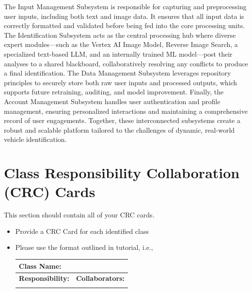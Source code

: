 \documentclass[]{article}
\begin{document}
\noindent The Input Management Subsystem is responsible for capturing and preprocessing user inputs, including both text and image data. It ensures that all input data is correctly formatted and validated before being fed into the core processing units. The Identification Subsystem acts as the central processing hub where diverse expert modules—such as the Vertex AI Image Model, Reverse Image Search, a specialized text-based LLM, and an internally trained ML model—post their analyses to a shared blackboard, collaboratively resolving any conflicts to produce a final identification. The Data Management Subsystem leverages repository principles to securely store both raw user inputs and processed outputs, which supports future retraining, auditing, and model improvement. Finally, the Account Management Subsystem handles user authentication and profile management, ensuring personalized interactions and maintaining a comprehensive record of user engagements. Together, these interconnected subsystems create a robust and scalable platform tailored to the challenges of dynamic, real-world vehicle identification.


	
\section{Class Responsibility Collaboration (CRC) Cards}
\label{sec:class_responsibility_collaboration_crc_cards}
This section should contain all of your CRC cards.

\begin{itemize}
	\item Provide a CRC Card for each identified class
	\item Please use the format outlined in tutorial, i.e., 
	\begin{table}[ht]
		\centering
		\begin{tabular}{|p{5cm}|p{5cm}|}
		\hline 
		 \multicolumn{2}{|l|}{\textbf{Class Name:}} \\
		\hline
		\textbf{Responsibility:} & \textbf{Collaborators:} \\
		\hline
		\vspace{1in} & \\
		\hline
		\end{tabular}
	\end{table}
	
\end{itemize}
\end{document}
